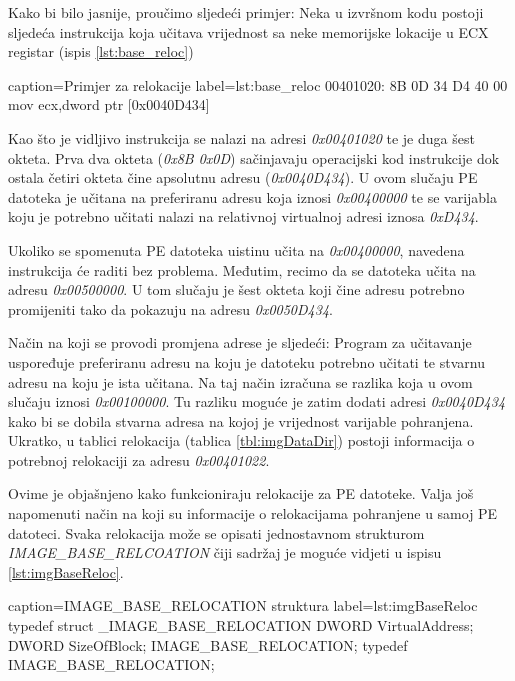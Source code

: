 \documentclass[times, utf8, diplomski, numeric]{fer}
\begin{document}
Kako bi bilo jasnije, proučimo sljedeći primjer: Neka u izvršnom
kodu postoji sljedeća instrukcija koja učitava vrijednost sa neke
memorijske lokacije u ECX registar (ispis \ref{lst:base_reloc})

\begin{ispis} {caption=Primjer za relokacije} {label=lst:base_reloc}
00401020: 8B 0D 34 D4 40 00  mov ecx,dword ptr [0x0040D434]
\end{ispis}

Kao što je vidljivo instrukcija se nalazi na adresi
\emph{0x00401020} te je duga šest okteta. Prva dva okteta
(\emph{0x8B 0x0D}) sačinjavaju operacijski kod instrukcije dok
ostala četiri okteta čine apsolutnu adresu (\emph{0x0040D434}). U
ovom slučaju PE datoteka je učitana na preferiranu adresu koja
iznosi \emph{0x00400000} te se varijabla koju je potrebno učitati
nalazi na relativnoj virtualnoj adresi iznosa \emph{0xD434}.

Ukoliko se spomenuta PE datoteka uistinu učita na
\emph{0x00400000}, navedena instrukcija će raditi bez problema.
Međutim, recimo da se datoteka učita na adresu \emph{0x00500000}.
U tom slučaju je šest okteta koji čine adresu potrebno
promijeniti tako da pokazuju na adresu \emph{0x0050D434}.

Način na koji se provodi promjena adrese je sljedeći: Program za
učitavanje uspoređuje preferiranu adresu na koju je datoteku
potrebno učitati te stvarnu adresu na koju je ista učitana. Na
taj način izračuna se razlika koja u ovom slučaju iznosi
\emph{0x00100000}. Tu razliku moguće je zatim dodati adresi
\emph{0x0040D434} kako bi se dobila stvarna adresa na kojoj je
vrijednost varijable pohranjena. Ukratko, u tablici relokacija
(tablica \ref{tbl:imgDataDir}) postoji informacija o potrebnoj
relokaciji za adresu \emph{0x00401022}.

Ovime je objašnjeno kako funkcioniraju relokacije za PE datoteke.
Valja još napomenuti način na koji su informacije o relokacijama
pohranjene u samoj PE datoteci. Svaka relokacija može se opisati
jednostavnom strukturom \emph{IMAGE\_BASE\_RELCOATION} čiji
sadržaj je moguće vidjeti u ispisu \ref{lst:imgBaseReloc}.

\begin{struktura} {caption=IMAGE\_BASE\_RELOCATION struktura} {label=lst:imgBaseReloc}
typedef struct _IMAGE_BASE_RELOCATION {
    DWORD   VirtualAddress;
    DWORD   SizeOfBlock;
} IMAGE_BASE_RELOCATION;
typedef IMAGE_BASE_RELOCATION;
\end{struktura}
\end{document}
